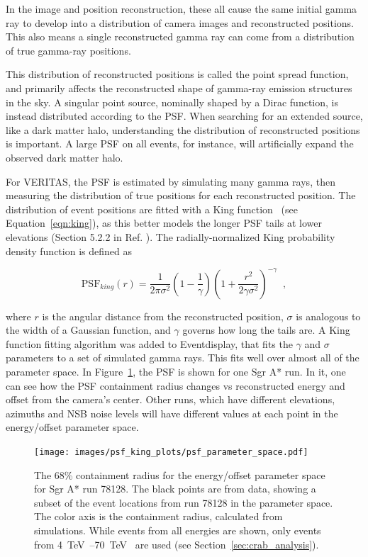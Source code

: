     In the image and position reconstruction, these all cause the same initial gamma ray to develop into a distribution of camera images and reconstructed positions.
    This also means a single reconstructed gamma ray can come from a distribution of true gamma-ray positions.

    This distribution of reconstructed positions is called the point spread function, and primarily affects the reconstructed shape of gamma-ray emission structures in the sky.
    A singular point source, nominally shaped by a Dirac function, is instead distributed according to the PSF.
    When searching for an extended source, like a dark matter halo, understanding the distribution of reconstructed positions is important.
    A large PSF on all events, for instance, will artificially expand the observed dark matter halo.

    For VERITAS, the PSF is estimated by simulating many gamma rays, then measuring the distribution of true positions for each reconstructed position.
    The distribution of event positions are fitted with a King function~\cite{king1962} (see Equation~\ref{eqn:king}), as this better models the longer PSF tails at lower elevations (Section 5.2.2 in Ref. \cite{Mayer2015}).
    The radially-normalized King probability density function is defined as

    \begin{equation} \label{eqn:king}
    \text{PSF}_{king}(r) = \frac{1}{2 \pi \sigma^{2} } \left( 1 - \frac{1}{\gamma} \right) \left( 1 + \frac{ r^{2} }{ 2 \gamma \sigma^{2} } \right)^{-\gamma} \;\;,
    \end{equation}

    where $r$ is the angular distance from the reconstructed position, $\sigma$ is analogous to the width of a Gaussian function, and $\gamma$ governs how long the tails are.
    A King function fitting algorithm was added to Eventdisplay, that fits the $\gamma$ and $\sigma$ parameters to a set of simulated gamma rays.
    This fits well over almost all of the parameter space.
    In Figure~\ref{fig:psf_paramspace}, the PSF is shown for one Sgr A* run.
    In it, one can see how the PSF containment radius changes vs reconstructed energy and offset from the camera's center.
    Other runs, which have different elevations, azimuths and NSB noise levels will have different values at each point in the energy/offset parameter space.

    \begin{figure}[!ht]
      \centering
      \texttt{[image: images/psf\_king\_plots/psf\_parameter\_space.pdf]}
      \caption[PSF Parameter Space]{
        The 68\% containment radius for the energy/offset parameter space for Sgr A* run 78128. 
        The black points are from data, showing a subset of the event locations from run 78128 in the parameter space.
        The color axis is the containment radius, calculated from simulations.
        While events from all energies are shown, only events from \SIrange{4}{70}{\TeV{}} are used (see Section~\ref{sec:crab_analysis}).
      }
      \label{fig:psf_paramspace}
    \end{figure}

